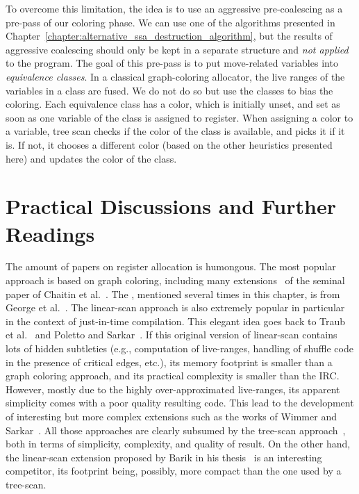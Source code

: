 {To overcome this limitation, the idea is to use an aggressive pre-coalescing as a pre-pass of our coloring phase.
We can use one of the algorithms presented in Chapter~\ref{chapter:alternative_ssa_destruction_algorithm}, but the results of aggressive coalescing should only be kept in a separate structure and \emph{not applied} to the program.
The goal of this pre-pass is to put move-related variables into \emph{equivalence classes}.
In a classical graph-coloring allocator, the live ranges of the variables in a class are fused.
We do not do so but use the classes to bias the coloring.
Each equivalence class has a color, which is initially unset, and set as soon as one variable of the class is assigned to register.
When assigning a color to a variable, tree scan checks if the color of the class is available, and picks it if it is.
If not, it chooses a different color (based on the other heuristics presented here) and updates the color of the class.

\section{Practical Discussions and Further Readings}
\label{sec:practical-regalloc}

The amount of papers on register allocation is humongous.
The most popular approach is based on graph coloring, including many extensions~\cite{chow1990priority,park2004optimistic,Lueh:2000} of the seminal paper of Chaitin et al.~\cite{chaitin:1981:register}.
The \irc, mentioned several times in this chapter, is from George et al.~\cite{george:96:iterated}.
The linear-scan approach is also extremely popular in particular in the context of just-in-time compilation.
This elegant idea goes back to Traub et al.~\cite{traub1998quality} and Poletto and Sarkar~\cite{Poletto99}.
If this original version of linear-scan contains lots of hidden subtleties (e.g., computation of live-ranges, handling of shuffle code in the presence of critical edges, etc.), its memory footprint is smaller than a graph coloring approach, and its practical complexity is smaller than the IRC.
However, mostly due to the highly over-approximated live-ranges, its apparent simplicity comes with a poor quality resulting code.
This lead to the development of interesting but more complex extensions such as the works of Wimmer and Sarkar~\cite{wimmer2005optimized,sarkar2007extended}.
All those approaches are clearly subsumed by the tree-scan approach~\cite{ColombetOct11}, both in terms of simplicity, complexity, and quality of result.
On the other hand, the linear-scan extension proposed by Barik in his thesis~\cite{barik2010efficient} is an interesting competitor, its footprint being, possibly, more compact than the one used by a tree-scan.

}
